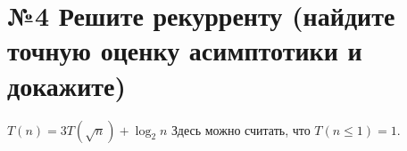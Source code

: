 
\section*{№4 Решите рекурренту (найдите точную оценку асимптотики и докажите)}

$T(n) = 3 T(\sqrt{n}) + \log_2 n$ Здесь можно считать, что $T(n \le 1) = 1$.

